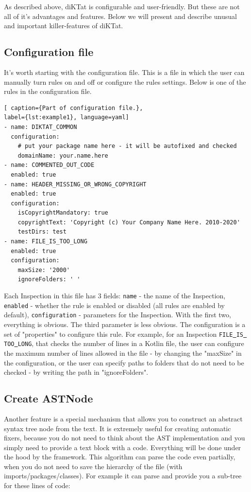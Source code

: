 \par As described above, diKTat is configurable and user-friendly. But these are not all of it's advantages and features. Below we will present and describe unusual and important killer-features of diKTat.

\subsection{Configuration file}
\par
It's worth starting with the configuration file. This is a file in which the user can manually turn rules on and off or configure the rules settings. Below is one of the rules in the configuration file.
\\
\begin{lstlisting}[ caption={Part of configuration file.},
label={lst:example1}, language=yaml]
- name: DIKTAT_COMMON
  configuration:
    # put your package name here - it will be autofixed and checked
    domainName: your.name.here
- name: COMMENTED_OUT_CODE
  enabled: true
- name: HEADER_MISSING_OR_WRONG_COPYRIGHT
  enabled: true
  configuration:
    isCopyrightMandatory: true
    copyrightText: 'Copyright (c) Your Company Name Here. 2010-2020'
    testDirs: test
- name: FILE_IS_TOO_LONG
  enabled: true
  configuration:
    maxSize: '2000'
    ignoreFolders: ' '
\end{lstlisting}
Each Inspection in this file has 3 fields: \texttt{name} - the name of the Inspection, \texttt{enabled} - whether the rule is enabled or disabled (all rules are enabled by default), \texttt{configuration} - parameters for the Inspection. With the first two, everything is obvious. The third parameter is less obvious. The configuration is a set of "properties" to configure this rule. For example, for an Inspection \texttt{FILE\underline{ }IS\underline{ }TOO\underline{ }LONG}, that checks the number of lines in a Kotlin file, the user can configure the maximum number of lines allowed in the file - by changing the "maxSize" in the configuration, or the user can specify paths to folders that do not need to be checked - by writing the path in "ignoreFolders". \\

\subsection{Create ASTNode}
Another feature is a special mechanism that allows you to construct an abstract syntax tree node from the text. It is extremely useful for creating automatic fixers, because you do not need to think about the AST implementation and you simply need to provide a text block with a code. Everything will be done under the hood by the framework. This algorithm can parse the code even partially, when you do not need to save the hierarchy of the file (with imports/packages/classes).
For example it can parse and provide you a sub-tree for these lines of code:

